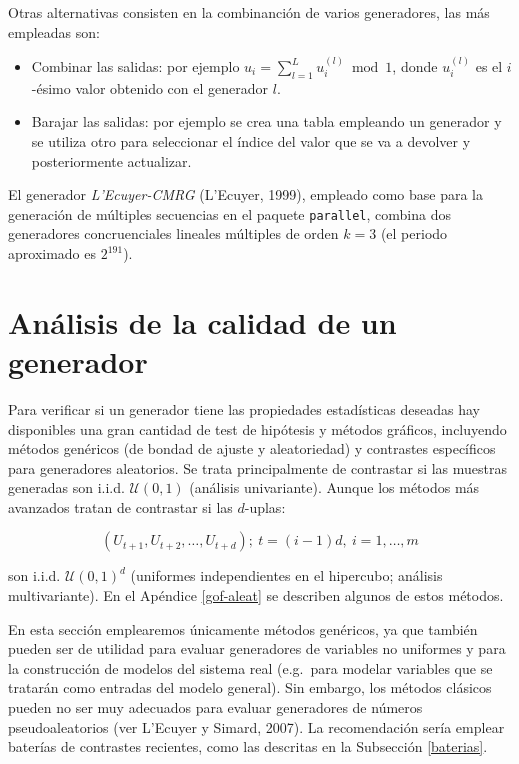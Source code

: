 \documentclass[
]{book}
\theoremstyle{break}
\theoremstyle{nonumberplain}
\begin{document}
Otras alternativas consisten en la combinanción de varios generadores, las más empleadas son:

\begin{itemize}
\item
  Combinar las salidas: por ejemplo \(u_{i}=\sum_{l=1}^L u_{i}^{(l)} \bmod 1\), donde \(u_{i}^{(l)}\) es el \(i\)-ésimo valor obtenido con el generador \(l\).
\item
  Barajar las salidas: por ejemplo se crea una tabla empleando un generador y se utiliza otro para seleccionar el índice del valor que se va a devolver y posteriormente actualizar.
\end{itemize}

El generador \emph{L'Ecuyer-CMRG} (L'Ecuyer, 1999), empleado como base para la generación de múltiples secuencias en el paquete \texttt{parallel}, combina dos generadores concruenciales lineales múltiples de orden \(k=3\) (el periodo aproximado es \(2^{191}\)).

\hypertarget{calgen}{%
\section{Análisis de la calidad de un generador}\label{calgen}}

Para verificar si un generador tiene las propiedades estadísticas deseadas hay disponibles una gran cantidad de test de hipótesis y métodos gráficos,
incluyendo métodos genéricos (de bondad de ajuste y aleatoriedad) y contrastes específicos para generadores aleatorios.
Se trata principalmente de contrastar si las muestras generadas son i.i.d. \(\mathcal{U}\left(0,1\right)\) (análisis univariante).
Aunque los métodos más avanzados tratan de contrastar si las \(d\)-uplas:

\[(U_{t+1},U_{t+2},\ldots,U_{t+d}); \ t=(i-1)d, \ i=1,\ldots,m\]

son i.i.d. \(\mathcal{U}\left(0,1\right)^{d}\) (uniformes independientes en el hipercubo; análisis multivariante).
En el Apéndice \ref{gof-aleat} se describen algunos de estos métodos.

En esta sección emplearemos únicamente métodos genéricos, ya que también pueden ser de utilidad para evaluar generadores de variables no uniformes y para la construcción de modelos del sistema real (e.g.~para modelar variables que se tratarán como entradas del modelo general).
Sin embargo, los métodos clásicos pueden no ser muy adecuados para evaluar generadores de números pseudoaleatorios (ver L'Ecuyer y Simard, 2007).
La recomendación sería emplear baterías de contrastes recientes, como las descritas en la Subsección \ref{baterias}.
\end{document}

